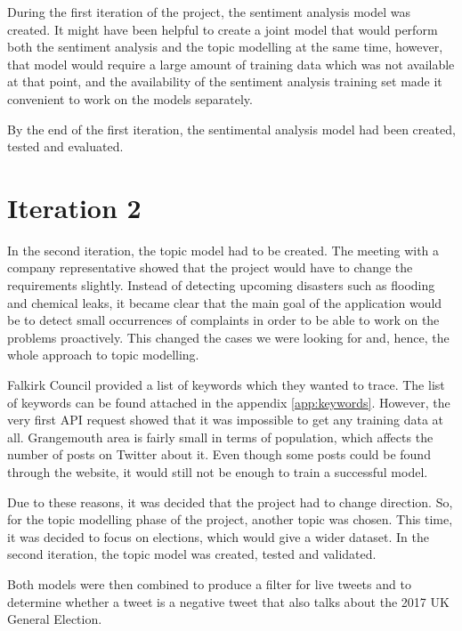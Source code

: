 During the first iteration of the project, the sentiment analysis model was created. It might have been helpful to create a joint model that would perform both the sentiment analysis and the topic modelling at the same time, however, that model would require a large amount of training data which was not available at that point, and the availability of the sentiment analysis training set made it convenient to work on the models separately.

By the end of the first iteration, the sentimental analysis model had been created, tested and evaluated.


\section{Iteration 2}
\label{sec:it2}

In the second iteration, the topic model had to be created. 
The meeting with a company representative showed that the project would have to change the requirements slightly. Instead of detecting upcoming disasters such as flooding and chemical leaks, it became clear that the main goal of the application would be to detect small occurrences of complaints in order to be able to work on the problems proactively. This changed the cases we were looking for and, hence, the whole approach to topic modelling. 

Falkirk Council provided a list of keywords which they wanted to trace. The list of keywords can be found attached in the appendix \ref{app:keywords}.
However, the very first API request showed that it was impossible to get any training data at all. Grangemouth area is fairly small in terms of population, which affects the number of posts on Twitter about it. Even though some posts could be found through the website, it would still not be enough to train a successful model. 

Due to these reasons, it was decided that the project had to change direction. So, for the topic modelling phase of the project, another topic was chosen. This time, it was decided to focus on elections, which would give a wider dataset. In the second iteration, the topic model was created, tested and validated.

Both models were then combined to produce a filter for live tweets and to determine whether a tweet is a negative tweet that also talks about the 2017 UK General Election. 